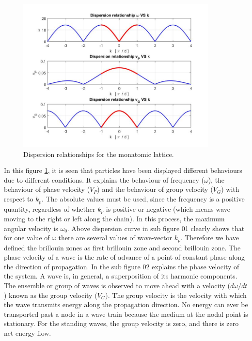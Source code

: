   \begin{figure}[hbt!]
	\centering
	\begin{framed}
	\includegraphics[width=0.9\textwidth]{Figures/N2.jpg}
	\end{framed}
	\caption{ Dispersion relationships for the monatomic lattice. }
	\label{fig:Lat2}
\end{figure}

In this figure \ref{fig:Lat2}, it is seen that particles have been displayed different behaviours due to different conditions. It explains the behaviour of frequency ($\omega$), the behaviour of phase velocity ($V_P$) and the behaviour of group velocity ($V_G$)  with respect to $k_p$. The absolute values must be used, since the frequency is a positive quantity, regardless of whether $k_p$ is positive or negative (which means wave moving to the right or left along the chain). In this process, the maximum angular velocity is $\omega_0$. Above dispersion curve in sub figure 01 clearly shows that for one value of $\omega$ there are several values of wave-vector $k_p$. Therefore we have defined the brillouin zones as first brillouin zone and second brillouin zone. The phase velocity  of a wave is the rate of advance of a point of constant phase along the direction of propagation. In the sub figure 02 explains the phase velocity of the system. A wave is, in general, a superposition of its harmonic components. The ensemble or group of waves is observed to move ahead with a velocity ($d\omega/dt$) known as the group velocity ($V_G$). The group velocity is the velocity with which the wave transmits energy along the propagation direction. No energy can ever be transported past a node in a wave train because the medium at the nodal point is stationary. For the standing waves, the group velocity is zero, and there is zero net energy flow.



